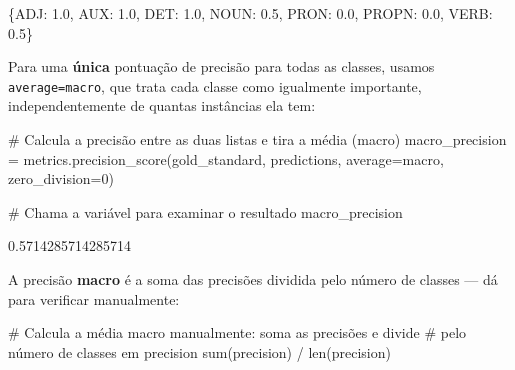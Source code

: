 \documentclass[
  brazilian,
  11pt,
]{article}
\newenvironment{Shaded}{\begin{snugshade}}{\end{snugshade}}
\newcommand{\BuiltInTok}[1]{\textcolor[rgb]{0.50,0.55,0.55}{#1}}
\newcommand{\CommentTok}[1]{\textcolor[rgb]{0.48,0.49,0.49}{#1}}
\newcommand{\DecValTok}[1]{\textcolor[rgb]{0.96,0.45,0.00}{#1}}
\newcommand{\NormalTok}[1]{\textcolor[rgb]{0.81,0.81,0.76}{#1}}
\newcommand{\OperatorTok}[1]{\textcolor[rgb]{0.81,0.81,0.76}{#1}}
\newcommand{\StringTok}[1]{\textcolor[rgb]{0.96,0.31,0.31}{#1}}
\let\oldtexttt\texttt
\renewcommand{\texttt}[1]{{\color{inlink}\oldtexttt{#1}}}
\begin{document}
\begin{Shaded}
\begin{Highlighting}[]
\NormalTok{\{\textquotesingle{}ADJ\textquotesingle{}: 1.0, \textquotesingle{}AUX\textquotesingle{}: 1.0, \textquotesingle{}DET\textquotesingle{}: 1.0, \textquotesingle{}NOUN\textquotesingle{}: 0.5, \textquotesingle{}PRON\textquotesingle{}: 0.0, \textquotesingle{}PROPN\textquotesingle{}: 0.0, \textquotesingle{}VERB\textquotesingle{}: 0.5\}}
\end{Highlighting}
\end{Shaded}

Para uma \textbf{única} pontuação de precisão para todas as classes,
usamos \texttt{average=\textquotesingle{}macro\textquotesingle{}}, que
trata cada classe como igualmente importante, independentemente de
quantas instâncias ela tem:

\begin{Shaded}
\begin{Highlighting}[]
\CommentTok{\# Calcula a precisão entre as duas listas e tira a média (macro)}
\NormalTok{macro\_precision }\OperatorTok{=}\NormalTok{ metrics.precision\_score(gold\_standard, predictions, average}\OperatorTok{=}\StringTok{\textquotesingle{}macro\textquotesingle{}}\NormalTok{, zero\_division}\OperatorTok{=}\DecValTok{0}\NormalTok{)}

\CommentTok{\# Chama a variável para examinar o resultado}
\NormalTok{macro\_precision}
\end{Highlighting}
\end{Shaded}

\begin{Shaded}
\begin{Highlighting}[]
\NormalTok{0.5714285714285714}
\end{Highlighting}
\end{Shaded}

A precisão \textbf{macro} é a soma das precisões dividida pelo número de
classes --- dá para verificar manualmente:

\begin{Shaded}
\begin{Highlighting}[]
\CommentTok{\# Calcula a média macro manualmente: soma as precisões e divide}
\CommentTok{\# pelo número de classes em \textquotesingle{}precision\textquotesingle{}}
\BuiltInTok{sum}\NormalTok{(precision) }\OperatorTok{/} \BuiltInTok{len}\NormalTok{(precision)}
\end{Highlighting}
\end{Shaded}
\end{document}
